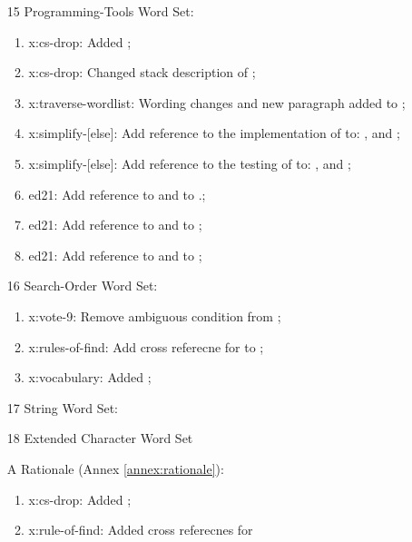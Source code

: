 \begin{itemize}
	\item[15] Programming-Tools Word Set:	%
		\begin{enumerate}
		\item \textsf{x:cs-drop}: Added ;
		\item \textsf{x:cs-drop}: Changed stack description of ;
		\item \textsf{x:traverse-wordlist}: Wording changes and new paragraph added
			to ;
		\item \textsf{x:simplify-[else]}: Add reference to the implementation of
			\word[tools]{[ELSE]} to:
			,
			 and
			;
		\item \textsf{x:simplify-[else]}: Add reference to the testing of
			\word[tools]{[THEN]} to:
			,
			 and
			;
		\item \textsf{ed21}: Add reference to \word[tools]{[IF]} and \word[tools]{[THEN]}
			to .;
		\item \textsf{ed21}: Add reference to \word[tools]{[ELSE]} and \word[tools]{[THEN]}
			to ;
		\item \textsf{ed21}: Add reference to \word[tools]{[IF]} and \word[tools]{[ELSE]}
			to ;
		\end{enumerate}
	\item[16] Search-Order Word Set:		%
		\begin{enumerate}
		\item \textsf{x:vote-9}: Remove ambiguous condition from
			;
		\item \textsf{x:rules-of-find}: Add cross referecne for
			 to ;
		\item \textsf{x:vocabulary}: Added ;
		\end{enumerate}
	\item[17] String Word Set:				%
	\item[18] Extended Character Word Set	%
	\item[A] Rationale (Annex \ref{annex:rationale}):	%
		\begin{enumerate}
		\item \textsf{x:cs-drop}: Added ;
		\item \textsf{x:rule-of-find}: Added cross referecnes for

\end{enumerate}
\end{itemize}
